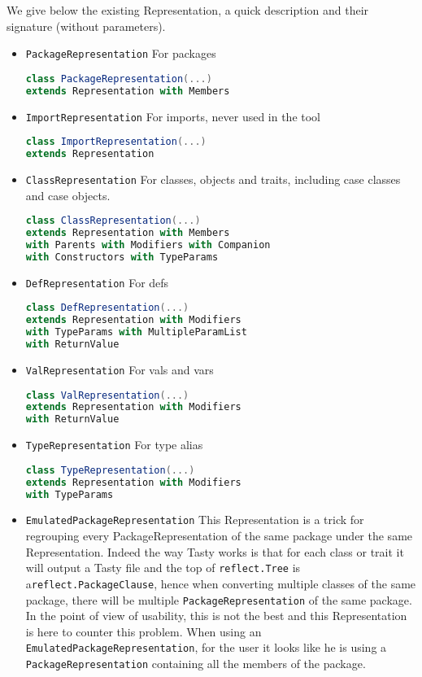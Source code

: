 \documentclass{report}
\begin{document}
We give below the existing Representation, a quick description and their signature (without parameters).
\begin{itemize}
    \item \texttt{PackageRepresentation} For packages
\begin{lstlisting}[language=scala]
class PackageRepresentation(...)
extends Representation with Members
\end{lstlisting}
    \item \texttt{ImportRepresentation} For imports, never used in the tool
\begin{lstlisting}[language=scala]
class ImportRepresentation(...)
extends Representation
\end{lstlisting}
    \item \texttt{ClassRepresentation} For classes, objects and traits, including case classes and case objects.
\begin{lstlisting}[language=scala]
class ClassRepresentation(...)
extends Representation with Members
with Parents with Modifiers with Companion
with Constructors with TypeParams
\end{lstlisting}
    \item \texttt{DefRepresentation} For defs
\begin{lstlisting}[language=scala]
class DefRepresentation(...)
extends Representation with Modifiers
with TypeParams with MultipleParamList
with ReturnValue
\end{lstlisting}
    \item \texttt{ValRepresentation} For vals and vars
\begin{lstlisting}[language=scala]
class ValRepresentation(...)
extends Representation with Modifiers
with ReturnValue
\end{lstlisting}
    \item \texttt{TypeRepresentation} For type alias
\begin{lstlisting}[language=scala]
class TypeRepresentation(...)
extends Representation with Modifiers
with TypeParams 
\end{lstlisting}
    \item \texttt{EmulatedPackageRepresentation} This Representation is a trick for regrouping every PackageRepresentation of the same package under the same Representation. Indeed the way Tasty works is that for each class or trait it will output a Tasty file and the top of \texttt{reflect.Tree} is a\texttt{reflect.PackageClause}, hence when converting multiple classes of the same package, there will be multiple \texttt{PackageRepresentation} of the same package. In the point of view of usability, this is not the best and this Representation is here to counter this problem. When using an \texttt{EmulatedPackageRepresentation}, for the user it looks like he is using a \texttt{PackageRepresentation} containing all the members of the package.
\end{itemize}
\end{document}
